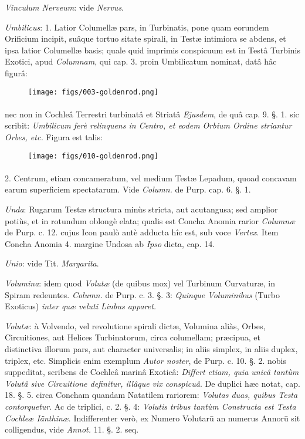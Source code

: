 \documentclass[a4paper, 11pt, oneside, polutonikogreek, german]{article}
\begin{document}
\emph{Vinculum Nerveum}: vide \emph{Nervus}.

\emph{Umbilicus}: 1. Latior Columellæ pars, in Turbinatis, pone quam eorundem Orificium incipit, suâque tortuo sitate spirali, in Testæ intimiora se abdens, et ipsa latior Columellæ basis; quale quid imprimis conspicuum est in Testâ Turbinis Exotici, apud \emph{Columnam}, qui cap. 3. proin Umbilicatum nominat, datâ hâc figurâ:

\begin{figure}[H]
\centering
\texttt{[image: figs/003-goldenrod.png]}
\end{figure}
\paragraph{}
nec non in Cochleâ Terrestri turbinatâ et Striatâ \emph{Ejusdem}, de quâ cap. 9. §. 1. sic scribit: \emph{Umbilicum ferè relinquens in Centro, et eodem Orbium Ordine striantur Orbes, etc.} Figura est talis:

\begin{figure}[H]
\centering
\texttt{[image: figs/010-goldenrod.png]}
\end{figure}
\paragraph{}
2. Centrum, etiam concameratum, vel medium Testæ Lepadum, quoad concavam earum superficiem spectatarum. Vide \emph{Column.} de Purp. cap. 6. §. 1.

\emph{Unda}: Rugarum Testæ structura minùs stricta, aut acutangusa; sed amplior potiùs, et in rotundum oblongè elata; qualis est Concha Anomia rarior \emph{Columnæ} de Purp. c. 12. cujus Icon paulò antè adducta hîc est, sub voce \emph{Vertex}. Item Concha Anomia 4. margine Undosa ab \emph{Ipso} dicta, cap. 14.

\emph{Unio}: vide Tit. \emph{Margarita}.

\emph{Volumina}: idem quod \emph{Volutæ} (de quibus mox) vel Turbinum Curvaturæ, in Spiram redeuntes. \emph{Column.} de Purp. c. 3. §. 3: \emph{Quinque Voluminibus} (Turbo Exoticus) \emph{inter quæ veluti Linbus apparet.}

\emph{Volutæ}: à Volvendo, vel revolutione spirali dictæ, Volumina aliàs, Orbes, Circuitiones, aut Helices Turbinatorum, circa columellam; præcipua, et distinctiva illorum pars, aut character universalis; in aliis simplex, in aliis duplex, triplex, etc. Simplicis enim exemplum \emph{Autor noster}, de Purp. c. 10. §. 2. nobis suppeditat, scribens de Cochleâ marinâ Exoticâ: \emph{Differt etiam, quia unicâ tantùm Volutâ sive Circuitione definitur, illâque vix conspicuâ}. De duplici hæc notat, cap. 18. §. 5. circa Concham quandam Natatilem rariorem: \emph{Volutas duas, quibus Testa contorquetur}. Ac de triplici, c. 2. §. 4: \emph{Volutis tribus tantùm Constructa est Testa Cochleæ Iänthinæ}. Indifferenter verò, ex Numero Volutarū an numerus Annorū sit colligendus, vide \emph{Annot.} 11. §. 2. seq.
\end{document}
